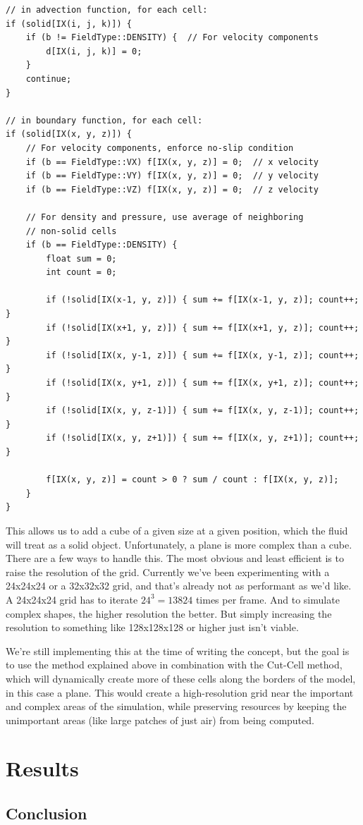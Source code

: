 \documentclass[a4paper,12pt]{article}
\begin{document}
\begin{lstlisting}
// in advection function, for each cell:
if (solid[IX(i, j, k)]) {
	if (b != FieldType::DENSITY) {  // For velocity components
		d[IX(i, j, k)] = 0;
	}
	continue;
}

// in boundary function, for each cell:
if (solid[IX(x, y, z)]) {
	// For velocity components, enforce no-slip condition
	if (b == FieldType::VX) f[IX(x, y, z)] = 0;  // x velocity
	if (b == FieldType::VY) f[IX(x, y, z)] = 0;  // y velocity
	if (b == FieldType::VZ) f[IX(x, y, z)] = 0;  // z velocity

	// For density and pressure, use average of neighboring
	// non-solid cells
	if (b == FieldType::DENSITY) {
		float sum = 0;
		int count = 0;

		if (!solid[IX(x-1, y, z)]) { sum += f[IX(x-1, y, z)]; count++; }
		if (!solid[IX(x+1, y, z)]) { sum += f[IX(x+1, y, z)]; count++; }
		if (!solid[IX(x, y-1, z)]) { sum += f[IX(x, y-1, z)]; count++; }
		if (!solid[IX(x, y+1, z)]) { sum += f[IX(x, y+1, z)]; count++; }
		if (!solid[IX(x, y, z-1)]) { sum += f[IX(x, y, z-1)]; count++; }
		if (!solid[IX(x, y, z+1)]) { sum += f[IX(x, y, z+1)]; count++; }

		f[IX(x, y, z)] = count > 0 ? sum / count : f[IX(x, y, z)];
	}
}
\end{lstlisting}

This allows us to add a cube of a given size at a given position, which the
fluid will treat as a solid object. Unfortunately, a plane is more complex than
a cube. There are a few ways to handle this. The most obvious and least efficient
is to raise the resolution of the grid. Currently we've been experimenting with a
24x24x24 or a 32x32x32 grid, and that's already not as performant as we'd like.
A 24x24x24 grid has to iterate $24^3 = 13824$ times per frame. And to simulate
complex shapes, the higher resolution the better. But simply increasing the
resolution to something like 128x128x128 or higher just isn't viable.

We're still implementing this at the time of writing the concept, but the goal
is to use the method explained above in combination with the Cut-Cell method,
which will dynamically create more of these cells along the borders of the model,
in this case a plane. This would create a high-resolution grid near the important
and complex areas of the simulation, while preserving resources by keeping the
unimportant areas (like large patches of just air) from being computed.

\section{Results}
\ipsum[1]

\subsection{Conclusion}
\ipsum[1]

\nocite{*}
\printbibliography
\end{document}
